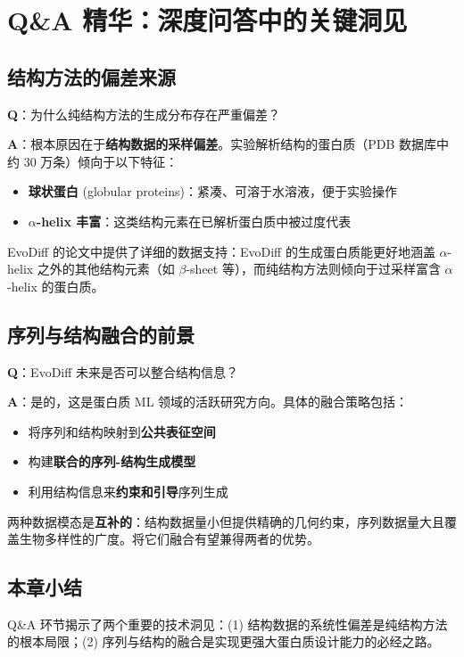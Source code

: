 \section{Q\&A 精华：深度问答中的关键洞见}

\subsection{结构方法的偏差来源}

\textbf{Q}：为什么纯结构方法的生成分布存在严重偏差？

\textbf{A}：根本原因在于\textbf{结构数据的采样偏差}。实验解析结构的蛋白质（PDB 数据库中约 30 万条）倾向于以下特征：
\begin{itemize}
    \item \textbf{球状蛋白} (globular proteins)：紧凑、可溶于水溶液，便于实验操作
    \item \textbf{$\alpha$-helix 丰富}：这类结构元素在已解析蛋白质中被过度代表
\end{itemize}

EvoDiff 的论文中提供了详细的数据支持：EvoDiff 的生成蛋白质能更好地涵盖 $\alpha$-helix 之外的其他结构元素（如 $\beta$-sheet 等），而纯结构方法则倾向于过采样富含 $\alpha$-helix 的蛋白质。

\subsection{序列与结构融合的前景}

\textbf{Q}：EvoDiff 未来是否可以整合结构信息？

\textbf{A}：是的，这是蛋白质 ML 领域的活跃研究方向。具体的融合策略包括：
\begin{itemize}
    \item 将序列和结构映射到\textbf{公共表征空间}
    \item 构建\textbf{联合的序列-结构生成模型}
    \item 利用结构信息来\textbf{约束和引导}序列生成
\end{itemize}

两种数据模态是\textbf{互补的}：结构数据量小但提供精确的几何约束，序列数据量大且覆盖生物多样性的广度。将它们融合有望兼得两者的优势。

\subsection{本章小结}

Q\&A 环节揭示了两个重要的技术洞见：(1) 结构数据的系统性偏差是纯结构方法的根本局限；(2) 序列与结构的融合是实现更强大蛋白质设计能力的必经之路。


